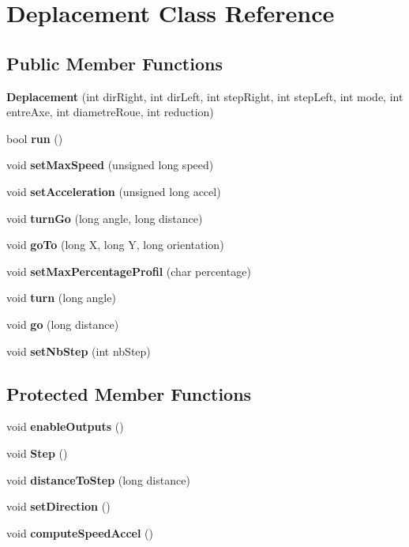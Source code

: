 \section{Deplacement Class Reference}
\label{class_deplacement}
\subsection*{Public Member Functions}
\begin{DoxyCompactItemize}
\item 
\label{class_deplacement_a89aa7394102665f2b9217283a4eb90f5} 
{\bfseries Deplacement} (int dir\+Right, int dir\+Left, int step\+Right, int step\+Left, int mode, int entre\+Axe, int diametre\+Roue, int reduction)
\item 
bool {\bf run} ()
\item 
void {\bf set\+Max\+Speed} (unsigned long speed)
\item 
void {\bf set\+Acceleration} (unsigned long accel)
\item 
void {\bf turn\+Go} (long angle, long distance)
\item 
void {\bf go\+To} (long X, long Y, long orientation)
\item 
void {\bf set\+Max\+Percentage\+Profil} (char percentage)
\item 
void {\bf turn} (long angle)
\item 
\label{class_deplacement_aec50cd8d856a1cd48394482f273c1a60} 
void {\bfseries go} (long distance)
\item 
\label{class_deplacement_a0bbdb2bb53503fbe80be74812e596514} 
void {\bfseries set\+Nb\+Step} (int nb\+Step)
\end{DoxyCompactItemize}
\subsection*{Protected Member Functions}
\begin{DoxyCompactItemize}
\item 
\label{class_deplacement_a154a7c5b3cb9c8195a4a69c2356b5c3b} 
void {\bfseries enable\+Outputs} ()
\item 
void {\bf Step} ()
\item 
void {\bf distance\+To\+Step} (long distance)
\item 
\label{class_deplacement_a6a46cee16f368917cfa920a8336220a1} 
void {\bfseries set\+Direction} ()
\item 
\label{class_deplacement_ac35b2bdce9ab731514456bdd4b474586} 
void {\bfseries compute\+Speed\+Accel} ()
\end{DoxyCompactItemize}


